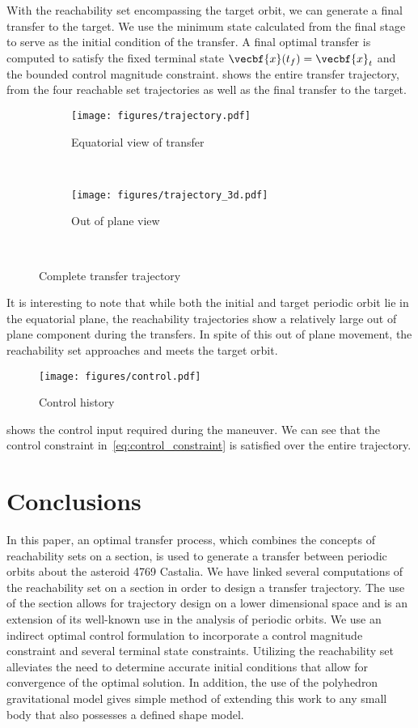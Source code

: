 With the reachability set encompassing the target orbit, we can generate a final transfer to the target.
We use the minimum state calculated from the final stage to serve as the initial condition of the transfer.
A final optimal transfer is computed to satisfy the fixed terminal state \( \vecbf{x}(t_f) = \vecbf{x}_t \) and the bounded control magnitude constraint.
 shows the entire transfer trajectory, from the four reachable set trajectories as well as the final transfer to the target.
\begin{figure}[htbp] 
    \centering 
    \begin{subfigure}[htbp]{0.45\textwidth} 
        \texttt{[image: figures/trajectory.pdf]} 
        \caption{Equatorial view of transfer} \label{fig:trajectory_up} 
    \end{subfigure}~
    \begin{subfigure}[htbp]{0.45\textwidth} 
        \texttt{[image: figures/trajectory\_3d.pdf]} 
        \caption{Out of plane view} \label{fig:trajectory_3d} 
    \end{subfigure}~ 
    \caption{Complete transfer trajectory}
    \label{fig:trajectory} 
\end{figure}
It is interesting to note that while both the initial and target periodic orbit lie in the equatorial plane, the reachability trajectories show a relatively large out of plane component during the transfers.
In spite of this out of plane movement, the reachability set approaches and meets the target orbit. 
\begin{figure}
    \centering
    \texttt{[image: figures/control.pdf]}
    \caption{Control history \label{fig:control}}
\end{figure}
 shows the control input required during the maneuver.
We can see that the control constraint in~\cref{eq:control_constraint} is satisfied over the entire trajectory.

\section{Conclusions}\label{sec:conclusions}

In this paper, an optimal transfer process, which combines the concepts of reachability sets on a \Poincare section, is used to generate a transfer between periodic orbits about the asteroid 4769 Castalia.
We have linked several computations of the reachability set on a \Poincare section in order to design a transfer trajectory.
The use of the \Poincare section allows for trajectory design on a lower dimensional space and is an extension of its well-known use in the analysis of periodic orbits.
We use an indirect optimal control formulation to incorporate a control magnitude constraint and several terminal state constraints.
Utilizing the reachability set alleviates the need to determine accurate initial conditions that allow for convergence of the optimal solution.
In addition, the use of the polyhedron gravitational model gives simple method of extending this work to any small body that also possesses a defined shape model.



